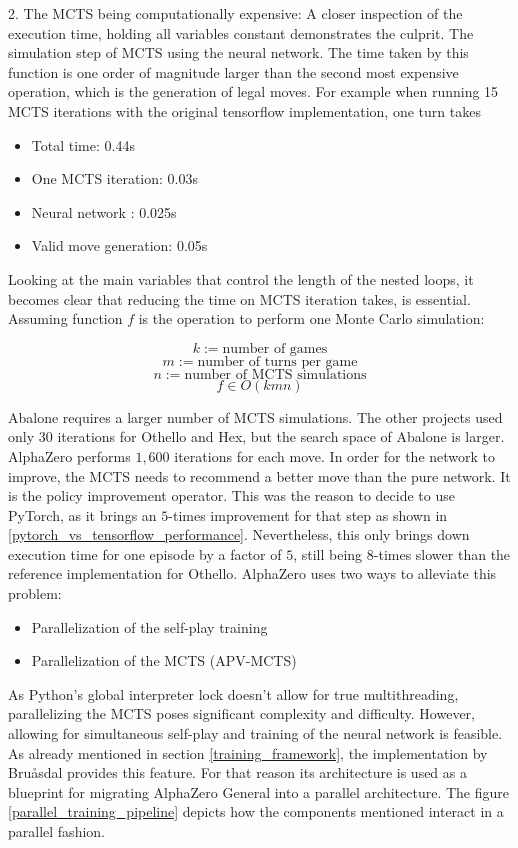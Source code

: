 2. The MCTS being computationally expensive: A closer inspection of the execution time, holding all variables constant demonstrates the culprit. The simulation step of MCTS using the neural network. The time taken by this function is one order of magnitude larger than the second most expensive operation, which is the generation of legal moves. For example when running 15 MCTS iterations with the original tensorflow implementation, one turn takes

\begin{itemize}
    \item Total time: 0.44s
    \item One MCTS iteration: 0.03s
    \item Neural network : 0.025s
    \item Valid move generation: 0.05s
\end{itemize}

Looking at the main variables that control the length of the nested loops, it becomes clear that reducing the time on MCTS iteration takes, is essential. Assuming function $f$ is the operation to perform one Monte Carlo simulation:

$$
    k := \text{number of games}
$$
$$
    m := \text{number of turns per game}
$$
$$
    n := \text{number of MCTS simulations}
$$
$$
    f \in O(kmn)
$$

Abalone requires a larger number of MCTS simulations. The other projects \cite{bruasdal_deep_2020,thakoor_learning_nodate} used only 30 iterations for Othello and Hex, but the search space of Abalone is larger. AlphaZero performs $1,600$ iterations \cite[p. 11]{silver_mastering_2017} for each move. In order for the network to improve, the MCTS needs to recommend a better move than the pure network. It is the policy improvement operator. This was the reason to decide to use PyTorch, as it brings an $5$-times improvement for that step as shown in \ref{pytorch_vs_tensorflow_performance}. Nevertheless, this only brings down execution time for one episode by a factor of $5$, still being $8$-times slower than the reference implementation for Othello. AlphaZero uses two ways to alleviate this problem:

\begin{itemize}
    \item Parallelization of the self-play training
    \item Parallelization of the MCTS (APV-MCTS)
\end{itemize}

As Python's global interpreter lock \cite{noauthor_globalinterpreterlock_nodate} doesn't allow for true multithreading, parallelizing the MCTS poses significant complexity and difficulty. However, allowing for simultaneous self-play and training of the neural network is feasible. As already mentioned in section \ref{training_framework}, the implementation by Bruåsdal \cite{bruasdal_deep_2020} provides this feature. For that reason its architecture is used as a blueprint for migrating AlphaZero General into a parallel architecture. The figure \ref{parallel_training_pipeline} depicts how the components mentioned interact in a parallel fashion.

